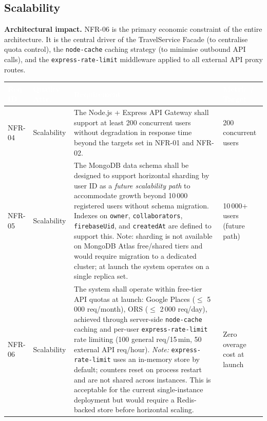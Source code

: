 \documentclass[12pt, a4paper]{article}
\newcommand{\reqid}[1]{\textsc{\small #1}}
\newcommand{\thcell}[1]{\textcolor{white}{\textbf{\small #1}}}
\begin{document}
\subsection{Scalability}

\begin{tcolorbox}[notebox]
  \textbf{Architectural impact.} NFR-06 is the primary economic constraint of the entire architecture. It is the central driver of the TravelService Facade (to centralise quota control), the \texttt{node-cache} caching strategy (to minimise outbound API calls), and the \texttt{express-rate-limit} middleware applied to all external API proxy routes.
\end{tcolorbox}

\vspace{0.4em}
\begin{longtable}{C{1.5cm} C{2.4cm} L{7.0cm} C{2.7cm}}
\toprule
{}
\thcell{Req ID} & \thcell{Quality Attr.} & \thcell{Requirement} & \thcell{Metric / Target} \\
\midrule
\endhead
\bottomrule
\endfoot

\reqid{NFR-04} & Scalability &
The Node.js + Express API Gateway shall support at least 200 concurrent users without degradation in response time beyond the targets set in NFR-01 and NFR-02. &
200 concurrent users \\

\reqid{NFR-05} & Scalability &
The MongoDB data schema shall be designed to support horizontal sharding by user ID as a \emph{future scalability path} to accommodate growth beyond 10\,000 registered users without schema migration. Indexes on \texttt{owner}, \texttt{collaborators}, \texttt{firebaseUid}, and \texttt{createdAt} are defined to support this. Note: sharding is not available on MongoDB Atlas free/shared tiers and would require migration to a dedicated cluster; at launch the system operates on a single replica set. &
10\,000$+$ users (future path) \\

\reqid{NFR-06} & Scalability &
The system shall operate within free-tier API quotas at launch: Google Places ($\leq$ 5\,000 req/month), ORS ($\leq$ 2\,000 req/day), achieved through server-side \texttt{node-cache} caching and per-user \texttt{express-rate-limit} rate limiting (100 general req/15\,min, 50 external API req/hour). \emph{Note:} \texttt{express-rate-limit} uses an in-memory store by default; counters reset on process restart and are not shared across instances. This is acceptable for the current single-instance deployment but would require a Redis-backed store before horizontal scaling. &
Zero overage cost at launch \\

\end{longtable}
\end{document}
